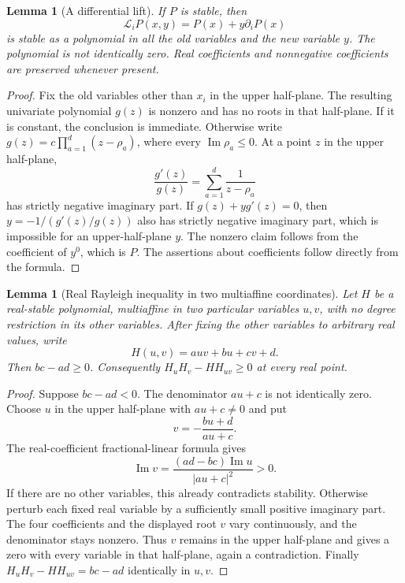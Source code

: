 \documentclass[11pt,a4paper]{article}
\newtheorem{lemma}[theorem]{Lemma}
\theoremstyle{definition}\newtheorem{definition}[theorem]{Definition}
\theoremstyle{remark}\newtheorem{remark}[theorem]{Remark}
\numberwithin{equation}{section}
\begin{document}
\begin{lemma}[A differential lift]\label{S05-lem:lift}
If $P$ is stable, then
\[
 \mathcal L_iP(x,y)=P(x)+y\partial_iP(x)
\]
is stable as a polynomial in all the old variables and the new variable $y$. The polynomial is not identically zero. Real coefficients and nonnegative coefficients are preserved whenever present.
\end{lemma}
\begin{proof}
Fix the old variables other than $x_i$ in the upper half-plane. The resulting univariate polynomial $g(z)$ is nonzero and has no roots in that half-plane. If it is constant, the conclusion is immediate. Otherwise write $g(z)=c\prod_{a=1}^d(z-\rho_a)$, where every $\operatorname{Im}\rho_a\le0$. At a point $z$ in the upper half-plane,
\[
 \frac{g'(z)}{g(z)}=\sum_{a=1}^d\frac1{z-\rho_a}
\]
has strictly negative imaginary part. If $g(z)+yg'(z)=0$, then $y=-1/(g'(z)/g(z))$ also has strictly negative imaginary part, which is impossible for an upper-half-plane $y$. The nonzero claim follows from the coefficient of $y^0$, which is $P$. The assertions about coefficients follow directly from the formula.
\end{proof}

\begin{lemma}[Real Rayleigh inequality in two multiaffine coordinates]\label{S05-lem:rayleigh}
Let $H$ be a real-stable polynomial, multiaffine in two particular variables $u,v$, with no degree restriction in its other variables. After fixing the other variables to arbitrary real values, write
\[
 H(u,v)=auv+bu+cv+d.
\]
Then $bc-ad\ge0$. Consequently $H_uH_v-HH_{uv}\ge0$ at every real point.
\end{lemma}
\begin{proof}
Suppose $bc-ad<0$. The denominator $au+c$ is not identically zero. Choose $u$ in the upper half-plane with $au+c\ne0$ and put
\[
 v=-\frac{bu+d}{au+c}.
\]
The real-coefficient fractional-linear formula gives
\[
 \operatorname{Im}v=\frac{(ad-bc)\operatorname{Im}u}{|au+c|^2}>0.
\]
If there are no other variables, this already contradicts stability. Otherwise perturb each fixed real variable by a sufficiently small positive imaginary part. The four coefficients and the displayed root $v$ vary continuously, and the denominator stays nonzero. Thus $v$ remains in the upper half-plane and gives a zero with every variable in that half-plane, again a contradiction. Finally $H_uH_v-HH_{uv}=bc-ad$ identically in $u,v$.
\end{proof}
\end{document}
